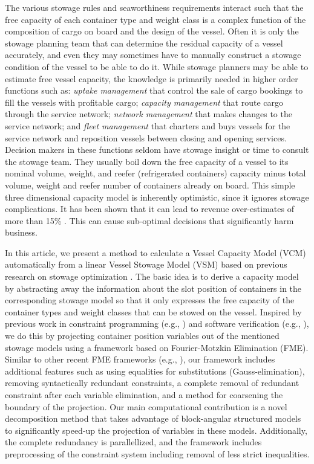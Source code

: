 The various stowage rules and seaworthiness requirements interact such that the free capacity of each container type and weight class is a complex function of the composition of cargo on board and the design of the vessel. Often it is only the stowage planning team that can determine the residual capacity of a vessel accurately, and even they may sometimes have to manually construct a stowage condition of the vessel to be able to do it. While stowage planners may be able to estimate free vessel capacity, the knowledge is primarily needed in higher order functions such as: {\em uptake management} that control the sale of cargo bookings to fill the vessels with profitable cargo; {\em capacity management} that route cargo through the service network; {\em network management} that makes changes to the service network; and {\em fleet management} that charters and buys vessels for the service network and reposition vessels between closing and opening services. Decision makers in these functions seldom have stowage insight or time to consult the stowage team. They usually boil down the free capacity of a vessel to its nominal volume, weight, and reefer (refrigerated containers) capacity minus total volume, weight and reefer number of containers already on board. This simple three dimensional capacity model is inherently optimistic, since it ignores stowage complications. It has been shown that it can lead to revenue over-estimates of more than 15\% \cite{AlbertosThesis}. This can cause sub-optimal decisions that significantly harm business.

In this article, we present a method to calculate a Vessel Capacity Model (VCM) automatically from a linear Vessel Stowage Model (VSM) based on previous research on stowage optimization \cite{pacino11,AlbertosThesis}. The basic idea is to derive a capacity model by abstracting away the information about the slot position of containers in the corresponding stowage model so that it only expresses the free capacity of the container types and weight classes that can be stowed on the vessel. Inspired by previous work in constraint programming (e.g., \cite{lassez90}) and software verification (e.g., \cite{benoy05}), we do this by projecting container position variables out of the mentioned stowage models using a framework based on Fourier-Motzkin Elimination (FME). Similar to other recent FME frameworks (e.g., \cite{simon05,lukatskii08,shapot12}), our framework includes additional features such as using equalities for substitutions (Gauss-elimination), removing syntactically redundant constraints, a complete removal of redundant constraint after each variable elimination, and a method for coarsening the boundary of the projection. Our main computational contribution is a novel decomposition method that takes advantage of block-angular structured models to significantly speed-up the projection of variables in these models. Additionally, the complete redundancy is parallellized, and the framework includes preprocessing of the constraint system including removal of less strict inequalities.

